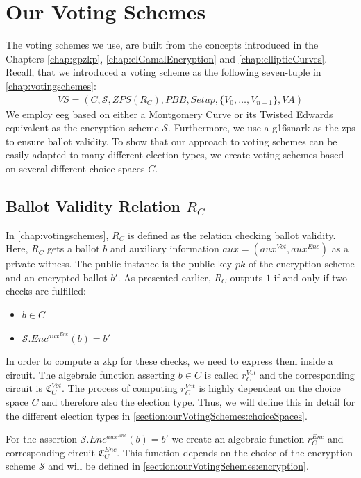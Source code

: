 \chapter{Our Voting Schemes}
\label{chap:ourVotingSchemes}

The voting schemes we use, are built from the concepts introduced in the Chapters \ref{chap:gpzkp}, \ref{chap:elGamalEncryption} and \ref{chap:ellipticCurves}.
Recall, that we introduced a voting scheme as the following seven-tuple in \cref{chap:votingschemes}:
\begin{align*}
    VS=(C, \mathcal{S}, ZPS(R_C), PBB, Setup, \{V_0, \dots, V_{n-1}\}, VA)
\end{align*}
We employ \gls{eeg} based on either a Montgomery Curve or its Twisted Edwards equivalent as the encryption scheme $\mathcal{S}$.
Furthermore, we use a \gls{g16snark} as the \gls{zps} to ensure ballot validity.
To show that our approach to voting schemes can be easily adapted to many different election types, we create voting schemes based on several different choice spaces $C$.

\section{Ballot Validity Relation $R_C$}
\label{section:ourVotingSchemes:ballotValidity}
In \cref{chap:votingschemes}, $R_C$ is defined as the relation checking ballot validity.
Here, $R_C$ gets a ballot $b$ and auxiliary information $aux=(aux^{Vot}, aux^{Enc})$ as a private witness.
The public instance is the public key $pk$ of the encryption scheme and an encrypted ballot $b'$.
As presented earlier, $R_C$ outputs $1$ if and only if two checks are fulfilled:
\begin{itemize}
    \item $b\in C$
    \item $\mathcal{S}.Enc^{aux^{Enc}}(b)=b'$
\end{itemize}
In order to compute a \gls{zkp} for these checks, we need to express them inside a circuit.
The algebraic function asserting $b\in C$ is called $r_C^{Vot}$ and the corresponding circuit is $\mathfrak{C}_C^{Vot}$.
The process of computing $r_C^{Vot}$ is highly dependent on the choice space $C$ and therefore also the election type.
Thus, we will define this in detail for the different election types in \cref{section:ourVotingSchemes:choiceSpaces}.

For the assertion $\mathcal{S}.Enc^{aux^{Enc}}(b)=b'$ we create an algebraic function $r_C^{Enc}$ and corresponding circuit $\mathfrak{C}_C^{Enc}$.
This function depends on the choice of the encryption scheme $\mathcal{S}$ and will be defined in \cref{section:ourVotingSchemes:encryption}.


